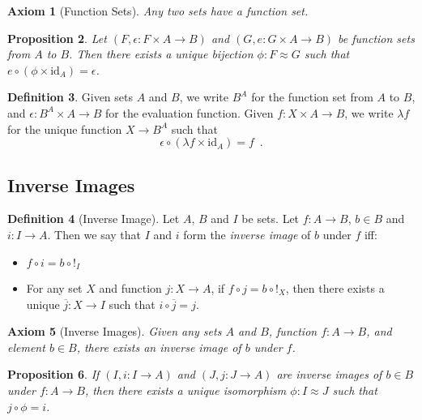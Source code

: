 \documentclass{book}
\newtheorem{prop}{Proposition}[chapter]
\newtheorem{ax}[prop]{Axiom}
\theoremstyle{definition}
\newtheorem{df}[prop]{Definition}
\newcommand{\id}[1]{\ensuremath{\mathrm{id}_{#1}}}
\begin{document}
\begin{ax}[Function Sets]
Any two sets have a function set.
\end{ax}

\begin{prop}
Let $(F, \epsilon : F \times A \rightarrow B)$ and $(G, e : G \times A \rightarrow B)$ be function sets from $A$ to $B$. Then there exists a unique bijection $\phi : F \approx G$ such that $e \circ (\phi \times \id{A}) = \epsilon$.
\end{prop}


\begin{df}
Given sets $A$ and $B$, we write $B^A$ for the function set from $A$ to $B$, and $\epsilon : B^A \times A \rightarrow B$ for the evaluation function. Given $f : X \times A \rightarrow B$, we write $\lambda f$ for the unique function $X \rightarrow B^A$ such that
\[ \epsilon \circ (\lambda f \times \id{A}) = f \enspace . \]
\end{df}

\subsection{Inverse Images}

\begin{df}[Inverse Image]
Let $A$, $B$ and $I$ be sets. Let $f : A \rightarrow B$, $b \in B$ and $i : I \rightarrow A$. Then we say that $I$ and $i$ form the \emph{inverse image} of $b$ under $f$ iff:
\begin{itemize}
\item $f \circ i = b \circ !_I$
\item For any set $X$ and function $j : X \rightarrow A$, if $f \circ j = b \circ !_X$, then there exists a unique $\overline{j} : X \rightarrow I$ such that $i \circ \overline{j} = j$.
\end{itemize}
\end{df}

\begin{ax}[Inverse Images]
Given any sets $A$ and $B$, function $f : A \rightarrow B$, and element $b \in B$, there exists an inverse image of $b$ under $f$.
\end{ax}

\begin{prop}
If $(I, i : I \rightarrow A)$ and $(J, j : J \rightarrow A)$ are inverse images of $b \in B$ under $f : A \rightarrow B$, then there exists a unique isomorphism $\phi : I \approx J$ such that $j \circ \phi = i$.
\end{prop}
\end{document}
